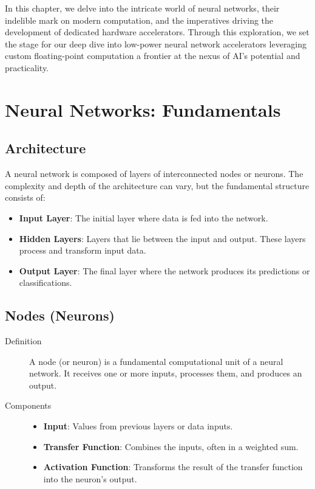 In this chapter, we delve into the intricate world of neural networks, their indelible mark on modern computation, and the imperatives driving the development of dedicated hardware accelerators. Through this exploration, we set the stage for our deep dive into low-power neural network accelerators leveraging custom floating-point computation a frontier at the nexus of AI's potential and practicality.

\section{Neural Networks: Fundamentals}

\subsection{Architecture}
A neural network is composed of layers of interconnected nodes or neurons. The complexity and depth of the architecture can vary, but the fundamental structure consists of:
\begin{itemize}
	\item \textbf{Input Layer}: The initial layer where data is fed into the network.
	\item \textbf{Hidden Layers}: Layers that lie between the input and output. These layers process and transform input data.
	\item \textbf{Output Layer}: The final layer where the network produces its predictions or classifications.
\end{itemize}

\subsection{Nodes (Neurons)}
\begin{description}
	\item[Definition] A node (or neuron) is a fundamental computational unit of a neural network. It receives one or more inputs, processes them, and produces an output.
	\item[Components]
	
	\begin{itemize}
		\item \textbf{Input}: Values from previous layers or data inputs.
		\item \textbf{Transfer Function}: Combines the inputs, often in a weighted sum.
		\item \textbf{Activation Function}: Transforms the result of the transfer function into the neuron's output.
	\end{itemize}
\end{description}

